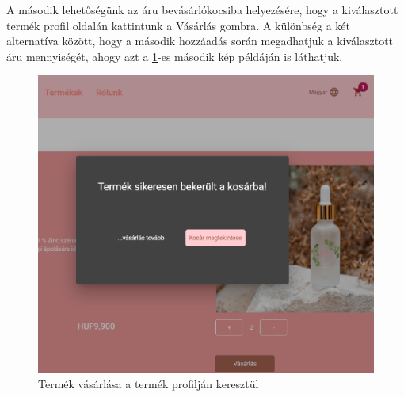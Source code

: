 A második lehetőségünk az áru bevásárlókocsiba helyezésére, hogy a kiválasztott termék profil oldalán kattintunk a Vásárlás gombra. A különbség a két alternatíva között, hogy a második hozzáadás során megadhatjuk a kiválasztott áru mennyiségét, ahogy azt a \ref{fig.exemple-10}-es második kép példáján is láthatjuk.
\begin{figure}[H]
	\centering
	\includegraphics[width=1.0\textwidth]{images/termek_vasarlas_2.png}
	\caption{Termék vásárlása a termék profilján keresztül}
	\label{fig.exemple-10}
\end{figure}

